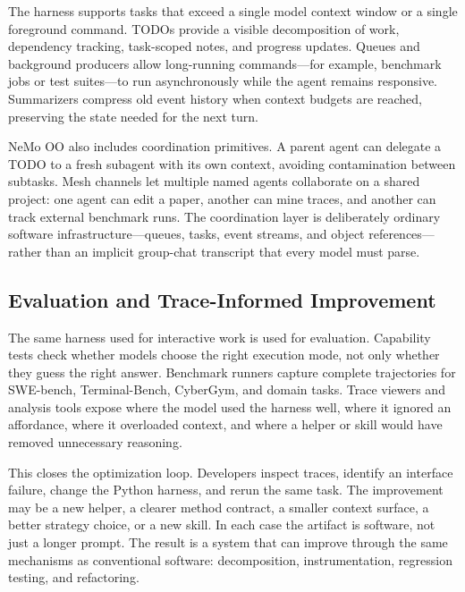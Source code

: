\documentclass[11pt, logo, onecolumn, copyright, colorlinks=true, allcolors=blue]{nvidiatechreport}
\begin{document}
The harness supports tasks that exceed a single model context window or a single
foreground command.  TODOs provide a visible decomposition of work, dependency
tracking, task-scoped notes, and progress updates.  Queues and background
producers allow long-running commands---for example, benchmark jobs or test
suites---to run asynchronously while the agent remains responsive.  Summarizers
compress old event history when context budgets are reached, preserving the
state needed for the next turn.

NeMo OO also includes coordination primitives.  A parent agent can delegate a
TODO to a fresh subagent with its own context, avoiding contamination between
subtasks.  Mesh channels let multiple named agents collaborate on a shared
project: one agent can edit a paper, another can mine traces, and another can
track external benchmark runs.  The coordination layer is deliberately ordinary
software infrastructure---queues, tasks, event streams, and object references---
rather than an implicit group-chat transcript that every model must parse.

\subsection{Evaluation and Trace-Informed Improvement}
\label{sec:harness:evaluation}

The same harness used for interactive work is used for evaluation.  Capability
tests check whether models choose the right execution mode, not only whether
they guess the right answer.  Benchmark runners capture complete trajectories
for SWE-bench, Terminal-Bench, CyberGym, and domain tasks.  Trace viewers and
analysis tools expose where the model used the harness well, where it ignored an
affordance, where it overloaded context, and where a helper or skill would have
removed unnecessary reasoning.

This closes the optimization loop.  Developers inspect traces, identify an
interface failure, change the Python harness, and rerun the same task.  The
improvement may be a new helper, a clearer method contract, a smaller context
surface, a better strategy choice, or a new skill.  In each case the artifact is
software, not just a longer prompt.  The result is a system that can improve
through the same mechanisms as conventional software: decomposition,
instrumentation, regression testing, and refactoring.
\end{document}
